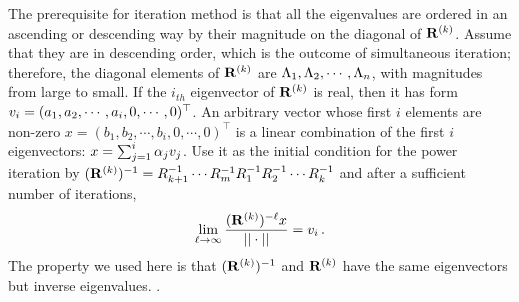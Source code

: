 \documentclass[final,leqno,onefignum,onetabnum]{siamltexmm}
\begin{document}
The prerequisite for iteration method is that all the eigenvalues are
ordered in an ascending or descending way by their magnitude on the
diagonal of $\mathbf{R}^{(k)}$. Assume that they are in descending order, which
is the outcome of simultaneous iteration; therefore, the diagonal elements
of $\mathbf{R}^{(k)}$ are $\Lambda_{1},\Lambda_{2},\cdots,\Lambda_{n}$, with
magnitudes from large to small.
If the $i_{th}$ eigenvector of $\mathbf{R}^{(k)}$ is real, then it has form
$v_{i}=(a_{1},a_{2},\allowbreak \cdots,a_{i},0,\cdots, 0)^\top $. An arbitrary
vector whose first $i$ elements are non-zero
$x=(b_{1},b_{2},\cdots,b_{i},0, \allowbreak \cdots, 0)^\top $ is a linear combination
of the first $i$ eigenvectors: $x=\sum_{j=1}^{i}\alpha_{j}v_{j}$.
Use it as the initial condition for the power iteration by
$(\mathbf{R}^{(k)})^{-1}=R_{k+1}^{-1}\cdots R_{m}^{-1}R_{1}^{-1}R_{2}^{-1}\cdots
R_{k}^{-1}$ and after a sufficient number of iterations,
\begin{equation}
  \label{eq:invpower}
  \lim_{\ell\to \infty} \frac{(\ps{R}{k})^{-\ell}x}{||\cdot||}=\Rve{i}
  \,.
\end{equation}
The property we used here is that $(\mathbf{R}^{(k)})^{-1}$ and $\mathbf{R}^{(k)}$ have
the same eigenvectors but inverse eigenvalues.
.
\end{document}
